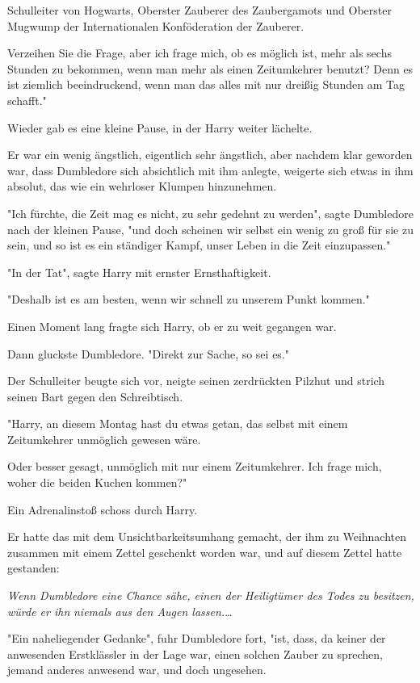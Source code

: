 {Schulleiter von Hogwarts, Oberster Zauberer des Zaubergamots und Oberster Mugwump der Internationalen Konföderation der Zauberer.

Verzeihen Sie die Frage, aber ich frage mich, ob es möglich ist, mehr als sechs Stunden zu bekommen, wenn man mehr als einen Zeitumkehrer benutzt? Denn es ist ziemlich beeindruckend, wenn man das alles mit nur dreißig Stunden am Tag schafft."

Wieder gab es eine kleine Pause, in der Harry weiter lächelte.

Er war ein wenig ängstlich, eigentlich sehr ängstlich, aber nachdem klar geworden war, dass Dumbledore sich absichtlich mit ihm anlegte, weigerte sich etwas in ihm absolut, das wie ein wehrloser Klumpen hinzunehmen.

"Ich fürchte, die Zeit mag es nicht, zu sehr gedehnt zu werden", sagte Dumbledore nach der kleinen Pause, "und doch scheinen wir selbst ein wenig zu groß für sie zu sein, und so ist es ein ständiger Kampf, unser Leben in die Zeit einzupassen."

"In der Tat", sagte Harry mit ernster Ernsthaftigkeit.

"Deshalb ist es am besten, wenn wir schnell zu unserem Punkt kommen."

Einen Moment lang fragte sich Harry, ob er zu weit gegangen war.

Dann gluckste Dumbledore. "Direkt zur Sache, so sei es."

Der Schulleiter beugte sich vor, neigte seinen zerdrückten Pilzhut und strich seinen Bart gegen den Schreibtisch.

"Harry, an diesem Montag hast du etwas getan, das selbst mit einem Zeitumkehrer unmöglich gewesen wäre.

Oder besser gesagt, unmöglich mit nur einem Zeitumkehrer. Ich frage mich, woher die beiden Kuchen kommen?"

Ein Adrenalinstoß schoss durch Harry.

Er hatte das mit dem Unsichtbarkeitsumhang gemacht, der ihm zu Weihnachten zusammen mit einem Zettel geschenkt worden war, und auf diesem Zettel hatte gestanden:

\emph{Wenn Dumbledore eine Chance sähe, einen der Heiligtümer des Todes zu besitzen, würde er ihn} \emph{niemals aus den Augen lassen.}…

"Ein naheliegender Gedanke", fuhr Dumbledore fort, "ist, dass, da keiner der anwesenden Erstklässler in der Lage war, einen solchen Zauber zu sprechen, jemand anderes anwesend war, und doch ungesehen.

}
